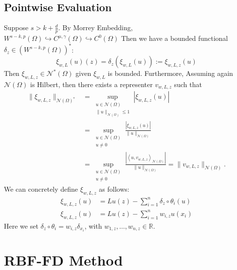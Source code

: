 \documentclass[11pt]{article}
\begin{document}
\subsection{Pointwise Evaluation}

Suppose $s > k + \frac{d}{p}$. By Morrey Embedding, $W^{s-k,p}(\Omega) \hookrightarrow C^{\mu,\gamma}(\Omega) \hookrightarrow C^{0}(\Omega)$  Then we have a bounded functional $\delta_z \in \left(W^{s-k,p}(\Omega) \right)^*$:
\begin{equation}
	\xi_{w,L}(u)(z) = \delta_z \left( \xi_{w,L} (u) \right) := \xi_{w,L,z} (u)
\end{equation}
Then $\xi_{w,L,z} \in \mathcal{N}^*(\Omega)$ given $\xi_{w,L}$ is bounded. Furthermore, Assuming again $\mathcal{N}(\Omega)$ is Hilbert, then there exists a representer $v_{w,L,z}$ such that
\begin{align*}
	\| \xi_{w,L,z} \|_{\mathcal{N}(\Omega)^*} &= \sup_{\substack{u \in \mathcal{N}(\Omega) \\ \| u \|_{\mathcal{N}(\Omega)} \le 1}} |\xi_{w,L,z}(u)| \\
	&= \sup_{\substack{u \in \mathcal{N}(\Omega) \\ u \ne 0}} \frac{|\xi_{w,L,z}(u)|}{\| u \|_{\mathcal{N}(\Omega)}} \\
	&= \sup_{\substack{u \in \mathcal{N}(\Omega) \\ u \ne 0}} \frac{|\left\langle u, v_{w,L,z} \right\rangle_{\mathcal{N}(\Omega)}|}{\| u \|_{\mathcal{N}(\Omega)}} = \| v_{w,L,z} \|_{\mathcal{N}(\Omega)}.
\end{align*}
We can concretely define $\xi_{w,L,z}$ as follows:
\begin{align*}
	\xi_{w,L,z}(u) &= Lu(z) - \sum_{i=1}^n \delta_z \circ\theta_i(u)\\
	\xi_{w,L,z}(u) &= Lu(z) - \sum_{i=1}^n w_{i,z} u(x_i)
\end{align*}
Here we set $\delta_z \circ \theta_{i} = w_{i,z} \delta_{x_i}$, with $w_{1,z}, \hdots, w_{n,z} \in \mathbb{R}$.

\pagebreak

\section{RBF-FD Method}
\end{document}
